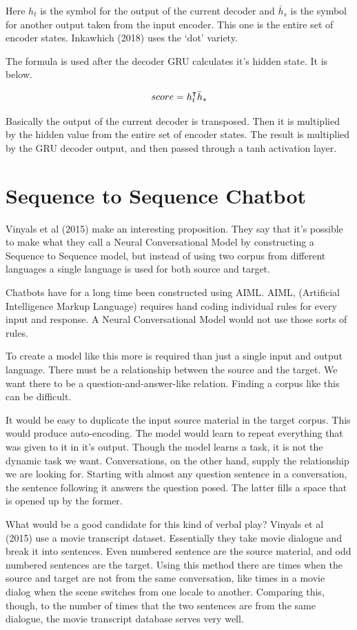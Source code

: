 Here $h_t$ is the symbol for the output of the current decoder and $\bar{h}_s $ is the symbol for another output taken from the input encoder. This one is the entire set of encoder states. Inkawhich (2018)\cite{2018Inkawhich} uses the `dot' variety.

The formula is used after the decoder GRU calculates it's hidden state. It is below.

$$ 
\boldmath
score = h_t^\intercal \bar{h}_s 
\unboldmath
$$ 

Basically the output of the current decoder is transposed. Then it is multiplied by the hidden value from the entire set of encoder states. The result is multiplied by the GRU decoder output, and then passed through a tanh activation layer.

\section{Sequence to Sequence Chatbot}

Vinyals et al (2015)\cite{DBLP:journals/corr/VinyalsL15} make an interesting proposition. They say that it's possible to make what they call a Neural Conversational Model by constructing a Sequence to Sequence model, but instead of using two corpus from different languages a single language is used for both source and target.

Chatbots have for a long time been constructed using \ac{AIML}. AIML, (Artificial Intelligence Markup Language) requires hand coding individual rules for every input and response. A Neural Conversational Model would not use those sorts of rules.

To create a model like this more is required than just a single input and output language. There must be a relationship between the source and the target. We want there to be a question-and-answer-like relation. Finding a corpus like this can be difficult.

It would be easy to duplicate the input source material in the target corpus. This would produce auto-encoding. The model would learn to repeat everything that was given to it in it's output. Though the model learns a task, it is not the dynamic task we want. Conversations, on the other hand, supply the relationship we are looking for. Starting with almost any question sentence in a conversation, the sentence following it answers the question posed. The latter fills a space that is opened up by the former. 

What would be a good candidate for this kind of verbal play? Vinyals et al (2015)\cite{DBLP:journals/corr/VinyalsL15} use a movie transcript dataset. Essentially they take movie dialogue and break it into sentences. Even numbered sentence are the source material, and odd numbered sentences are the target. Using this method there are times when the source and target are not from the same conversation, like times in a movie dialog when the scene switches from one locale to another. Comparing this, though, to the number of times that the two sentences are from the same dialogue, the movie transcript database serves very well.

